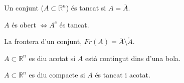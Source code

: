 \documentclass[../main.tex]{subfiles}
\begin{document}
    \begin{definicio}
        Un conjunt ($A \subset \mathbb{R}^n$) és tancat si $A = \overline{A}$.
    \end{definicio}
    \begin{proposicio}
        $A$ és obert $\Longleftrightarrow A^c$ és tancat. 
    \end{proposicio}
    \begin{definicio}
        La frontera d'un conjunt, $Fr\left( A \right) = \overline{A} \setminus \mathring{A}$.
    \end{definicio}
    \begin{definicio}
        $A \subset \mathbb{R}^n$ es diu acotat si $A$ està contingut dins d'una bola.
    \end{definicio}
    \begin{definicio}
        $A \subset \mathbb{R}^n$ es diu compacte si $A$ és tancat i acotat.
    \end{definicio}
\end{document}

